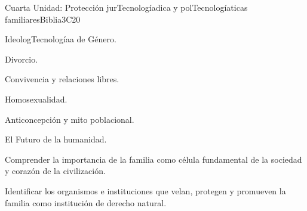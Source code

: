 \begin{syllabus}
\begin{unit}{}{Cuarta Unidad: Protección jurTecnologíadica y polTecnologíaticas familiares}{Biblia}{3}{C20}
\begin{topics}
	\item IdeologTecnologíaa de Género.
	\item Divorcio.
	\item Convivencia y relaciones libres.
	\item Homosexualidad.
	\item Anticoncepción y mito poblacional.
	\item El Futuro de la humanidad.
\end{topics}
\begin{learningoutcomes}
	\item Comprender la importancia de la familia como célula fundamental de la sociedad y corazón de la civilización.
    \item Identificar los organismos e instituciones que velan, protegen y promueven la familia como institución de derecho natural.
\end{learningoutcomes}
\end{unit}



\begin{coursebibliography}
\end{coursebibliography}

\end{syllabus}
